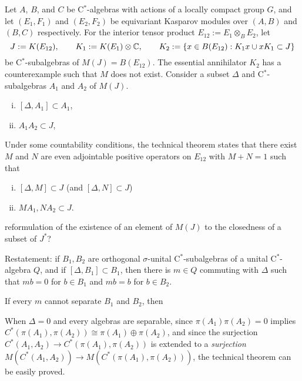 \documentclass{../../large}
\begin{document}
\begin{prb}
Let $A$, $B$, and $C$ be C$^*$-algebras with actions of a locally compact group $G$, and let $(E_1,F_1)$ and $(E_2,F_2)$ be equivariant Kasparov modules over $(A,B)$ and $(B,C)$ respectively.
For the interior tensor product $E_{12}:=E_1\otimes_BE_2$, let
\[J:=K(E_{12}),\qquad K_1:=K(E_1)\otimes\mathbb{C},\qquad K_2:=\{x\in B(E_{12}):K_1x\cup xK_1\subset J\}\]
be C$^*$-subalgebras of $M(J)=B(E_{12})$.
The essential annihilator $K_2$ has a counterexample such that $M$ does not exist.
Consider a subset $\Delta$ and C$^*$-subalgebras $A_1$ and $A_2$ of $M(J)$.

\begin{enumerate}[(i)]
\item $[\Delta,A_1]\subset A_1$,
\item $A_1A_2\subset J$,
\end{enumerate}
Under some countability conditions, the technical theorem states that there exist $M$ and $N$ are even adjointable positive operators on $E_{12}$ with $M+N=1$ such that
\begin{enumerate}[(i)]
\item $[\Delta,M]\subset J$ (and $[\Delta,N]\subset J$)
\item $MA_1,NA_2\subset J$.
\end{enumerate}


reformulation of the existence of an element of $M(J)$ to the closedness of a subset of $J^*$?

Restatement: if $B_1,B_2$ are orthogonal $\sigma$-unital C$^*$-subalgebras of a unital C$^*$-algebra $Q$, and if $[\Delta,B_1]\subset B_1$, then there is $m\in Q$ commuting with $\Delta$ such that $mb=0$ for $b\in B_1$ and $mb=b$ for $b\in B_2$.


If every $m$ cannot separate $B_1$ and $B_2$, then

When $\Delta=0$ and every algebras are separable, since $\pi(A_1)\pi(A_2)=0$ implies $C^*(\pi(A_1),\pi(A_2))\cong\pi(A_1)\oplus\pi(A_2)$, and since the surjection $C^*(A_1,A_2)\to C^*(\pi(A_1),\pi(A_2))$ is extended to a \emph{surjection} $M(C^*(A_1,A_2))\to M(C^*(\pi(A_1),\pi(A_2)))$, the technical theorem can be easily proved.





\end{prb}
\end{document}
